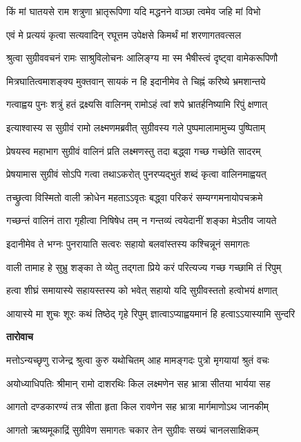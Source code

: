 \twolineshloka
{किं मां घातयसे राम शत्रुणा भ्रातृरूपिणा}
{यदि मद्धनने वाञ्छा त्वमेव जहि मां विभो} %

\twolineshloka
{एवं मे प्रत्ययं कृत्वा सत्यवादिन् रघूत्तम}
{उपेक्षसे किमर्थं मां शरणागतवत्सल} %

\twolineshloka
{श्रुत्वा सुग्रीववचनं रामः साश्रुविलोचनः}
{आलिङ्ग्य मा स्म भैषीस्त्वं दृष्ट्वा वामेकरूपिणौ} %

\twolineshloka
{मित्रघातित्वमाशङ्क्य मुक्तवान् सायकं न हि}
{इदानीमेव ते चिह्नं करिष्ये भ्रमशान्तये} %

\twolineshloka
{गत्वाह्वय पुनः शत्रुं हतं द्रक्ष्यसि वालिनम्}
{रामोऽहं त्वां शपे भ्रातर्हनिष्यामि रिपुं क्षणात्} %

\twolineshloka
{इत्याश्वास्य स सुग्रीवं रामो लक्ष्मणमब्रवीत्}
{सुग्रीवस्य गले पुष्पमालामामुच्य पुष्पिताम्} %

\twolineshloka
{प्रेषयस्व महाभाग सुग्रीवं वालिनं प्रति}
{लक्ष्मणस्तु तदा बद्ध्वा गच्छ गच्छेति सादरम्} %

\twolineshloka
{प्रेषयामास सुग्रीवं सोऽपि गत्वा तथाऽकरोत्}
{पुनरप्यद्भुतं शब्दं कृत्वा वालिनमाह्वयत्} %

\twolineshloka
{तच्छ्रुत्वा विस्मितो वाली क्रोधेन महताऽऽवृतः}
{बद्ध्वा परिकरं सम्यग्गमनायोपचक्रमे} %

\twolineshloka
{गच्छन्तं वालिनं तारा गृहीत्वा निषिषेध तम्}
{न गन्तव्यं त्वयेदानीं शङ्का मेऽतीव जायते} %

\twolineshloka
{इदानीमेव ते भग्नः पुनरायाति सत्वरः}
{सहायो बलवांस्तस्य कश्चिन्नूनं समागतः} %

\twolineshloka
{वाली तामाह हे सुभ्रु शङ्का ते व्येतु तद्गता}
{प्रिये करं परित्यज्य गच्छ गच्छामि तं रिपुम्} %

\twolineshloka
{हत्वा शीघ्रं समायास्ये सहायस्तस्य को भवेत्}
{सहायो यदि सुग्रीवस्ततो हत्वोभयं क्षणात्} %

\twolineshloka
{आयास्ये मा शुचः शूरः कथं तिष्ठेद् गृहे रिपुम्}
{ज्ञात्वाऽप्याह्वयमानं हि हत्वाऽऽयास्यामि सुन्दरि} %

\textbf{तारोवाच}

\twolineshloka
{मत्तोऽन्यच्छृणु राजेन्द्र श्रुत्वा कुरु यथोचितम्}
{आह मामङ्गदः पुत्रो मृगयायां श्रुतं वचः} %

\twolineshloka
{अयोध्याधिपतिः श्रीमान् रामो दाशरथिः किल}
{लक्ष्मणेन सह भ्रात्रा सीतया भार्यया सह} %

\twolineshloka
{आगतो दण्डकारण्यं तत्र सीता हृता किल}
{रावणेन सह भ्रात्रा मार्गमाणोऽथ जानकीम्} %

\twolineshloka
{आगतो ऋष्यमूकाद्रिं सुग्रीवेण समागतः}
{चकार तेन सुग्रीवः सख्यं चानलसाक्षिकम्} %

